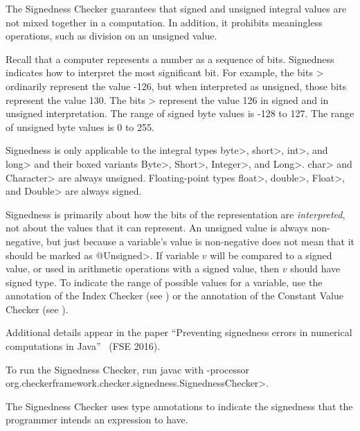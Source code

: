 \htmlhr
{}

The Signedness Checker guarantees that signed and unsigned integral values are not mixed
together in a computation. In addition, it prohibits meaningless operations, such
as division on an unsigned value.

Recall that a computer represents a number as a sequence of bits.
Signedness indicates how to interpret the most significant bit.  For
example, the bits > ordinarily represent the value -126, but when
interpreted as unsigned, those bits represent the value 130.  The bits
> represent the value 126 in signed and in unsigned interpretation.
The range of signed byte values is -128 to 127.  The range of unsigned byte
values is 0 to 255.

Signedness is only applicable to the integral types \<byte>,
\<short>, \<int>, and \<long> and their boxed variants \<Byte>,
\<Short>, \<Integer>, and \<Long>.
\<char> and \<Character> are always unsigned.
Floating-point types \<float>, \<double>, \<Float>, and \<Double> are always signed.

Signedness is primarily about how the bits of the representation are
\emph{interpreted}, not about the values that it can represent.  An unsigned value
is always non-negative, but just because a variable's value is non-negative does
not mean that it should be marked as \<@Unsigned>.  If variable $v$ will be
compared to a signed value, or used in arithmetic operations with a signed
value, then $v$ should have signed type.
To indicate the range of possible values for a variable, use the
 annotation of the Index
Checker (see ) or the
 annotation of the Constant Value
Checker (see ).

Additional details appear in the paper
``Preventing signedness errors in numerical computations in
Java''~\cite{Mackie2016} (FSE 2016).

To run the Signedness Checker, run javac with
\<-processor org.checkerframework.checker.signedness.SignednessChecker>.



The Signedness Checker uses type annotations to indicate the signedness that the programmer intends an expression to have.


